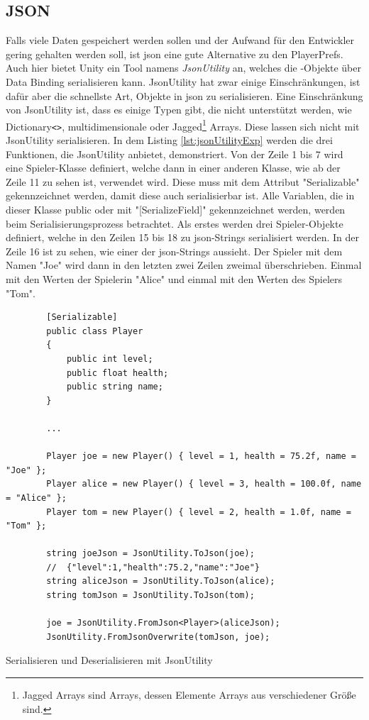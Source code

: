 \subsection{JSON}
Falls viele Daten gespeichert werden sollen und der Aufwand für den Entwickler gering gehalten werden soll, ist \ac{json} eine gute Alternative zu den PlayerPrefs. Auch hier bietet Unity ein Tool namens \textit{JsonUtility} an, welches die \csharp{}-Objekte über Data Binding serialisieren kann. JsonUtility hat zwar einige Einschränkungen, ist dafür aber die schnellste Art, Objekte in \ac{json} zu serialisieren. Eine Einschränkung von JsonUtility ist, dass es einige Typen gibt, die nicht unterstützt werden, wie Dictionary\texttt{<>}, multidimensionale oder Jagged\footnote{Jagged Arrays sind Arrays, dessen Elemente Arrays aus verschiedener Größe sind.\cite{microsoftVerzweigteArrays}} Arrays. Diese lassen sich nicht mit JsonUtility serialisieren. In dem Listing \ref{lst:jsonUtilityExp} werden die drei Funktionen, die JsonUtility anbietet, demonstriert. Von der Zeile 1 bis 7 wird eine Spieler-Klasse definiert, welche dann in einer anderen Klasse, wie ab der Zeile 11 zu sehen ist, verwendet wird. Diese muss mit dem Attribut "Serializable" gekennzeichnet werden, damit diese auch serialisierbar ist. Alle Variablen, die in dieser Klasse public oder mit "[SerializeField]" gekennzeichnet werden, werden beim Serialisierungsprozess betrachtet. Als erstes werden drei Spieler-Objekte definiert, welche in den Zeilen 15 bis 18 zu \ac{json}-Strings serialisiert werden. In der Zeile 16 ist zu sehen, wie einer der \ac{json}-Strings aussieht. Der Spieler mit dem Namen "Joe" wird dann in den letzten zwei Zeilen zweimal überschrieben. Einmal mit den Werten der Spielerin "Alice" und einmal mit den Werten des Spielers "Tom".\cite{unityJsonUtility}\cite{unitySerializationRules} 

\begin{listing}[htp]
    \begin{verbatim} 
        [Serializable]
        public class Player
        {
            public int level;
            public float health;
            public string name;
        }

        ...
        
        Player joe = new Player() { level = 1, health = 75.2f, name = "Joe" };
        Player alice = new Player() { level = 3, health = 100.0f, name = "Alice" };
        Player tom = new Player() { level = 2, health = 1.0f, name = "Tom" };

        string joeJson = JsonUtility.ToJson(joe);
        //  {"level":1,"health":75.2,"name":"Joe"}
        string aliceJson = JsonUtility.ToJson(alice);
        string tomJson = JsonUtility.ToJson(tom);

        joe = JsonUtility.FromJson<Player>(aliceJson);
        JsonUtility.FromJsonOverwrite(tomJson, joe);
    \end{verbatim}
    \caption{Serialisieren und Deserialisieren mit JsonUtility}
    \label{lst:jsonUtilityExp}
\end{listing}

